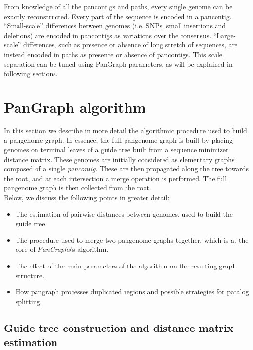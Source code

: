 \documentclass[aps,rmp,reprint,superscriptaddress,notitlepage,10pt,onecolumn]{revtex4-1}
\begin{document}
From knowledge of all the pancontigs and paths, every single genome can be exactly reconstructed. Every part of the sequence is encoded in a pancontig. ``Small-scale'' differences between genomes (i.e. SNPs, small insertions and deletions) are encoded in pancontigs as variations over the consensus. ``Large-scale'' differences, such as presence or absence of long stretch of sequences, are instead encoded in paths as presence or absence of pancontigs. This scale separation can be tuned using PanGraph parameters, as will be explained in following sections.


\section{PanGraph algorithm}
\label{sec:pangraph-algo}

In this section we describe in more detail the algorithmic procedure used to build a pangenome graph. In essence, the full pangenome graph is built by placing genomes on terminal leaves of a guide tree built from a sequence minimizer distance matrix. These genomes are initially considered as elementary graphs composed of a single \textit{pancontig}. These are then propagated along the tree towards the root, and at each intersection a merge operation is performed. The full pangenome graph is then collected from the root.\\

Below, we discuss the following points in greater detail:
\begin{itemize}
    \item The estimation of pairwise distances between genomes, used to build the guide tree.
    \item The procedure used to merge two pangenome graphs together, which is at the core of \textit{PanGraphs}'s algorithm.
    \item The effect of the main parameters of the algorithm on the resulting graph structure.
    \item How pangraph processes duplicated regions and possible strategies for paralog splitting.
\end{itemize}

\subsection{Guide tree construction and distance matrix estimation}
\end{document}
